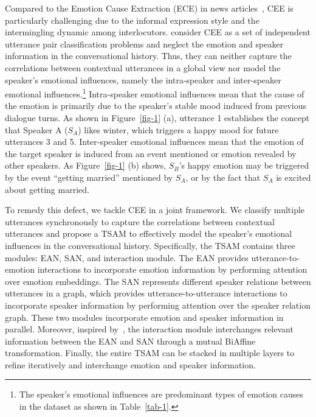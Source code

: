 \documentclass[11pt]{article}
\begin{document}
Compared to the Emotion Cause Extraction (ECE) in news articles~\citep{gui2016event,xia2019emotion}, CEE is particularly challenging due to the informal expression style and the intermingling dynamic among interlocutors. 
\citet{poria2021recognizing} consider CEE as a set of independent utterance pair classification problems and neglect the emotion and speaker information in the conversational history. Thus, they can neither capture the correlations between contextual utterances in a global view nor model the speaker's emotional influences, namely the intra-speaker and inter-speaker emotional influences.\footnote{The speaker's emotional influences are predominant types of emotion causes in the dataset as shown in Table~\ref{tab-1}.}
Intra-speaker emotional influences mean that the cause of the emotion is primarily due to the speaker's stable mood induced from previous dialogue turns. As shown in Figure~\ref{fig-1} (a), utterance 1 establishes the concept that Speaker A ($S_A$) likes winter, which triggers a happy mood for future utterances 3 and 5. Inter-speaker emotional influences mean that the emotion of the target speaker is induced from an event mentioned or emotion revealed by other speakers. As Figure~\ref{fig-1} (b) shows, $S_B$'s happy emotion may be triggered by the event ``getting married'' mentioned by $S_A$, or by the fact that $S_A$ is excited about getting married. 

To remedy this defect, we tackle CEE in a joint framework. We classify multiple utterances synchronously to capture the correlations between contextual utterances and propose a TSAM to effectively model the speaker's emotional influences in the conversational history. Specifically, the TSAM contains three modules: EAN, SAN, and interaction module. The EAN provides utterance-to-emotion interactions to incorporate emotion information by performing attention over emotion embeddings. The SAN represents different speaker relations between utterances in a graph, which provides utterance-to-utterance interactions to incorporate speaker information by performing attention over the speaker relation graph. These two modules incorporate emotion and speaker information in parallel. Moreover, inspired by~\citep{li2021dual,tang2020dependency}, the interaction module interchanges relevant information between the EAN and SAN through a mutual BiAffine transformation. Finally, the entire TSAM can be stacked in multiple layers to refine iteratively and interchange emotion and speaker information.
\end{document}
